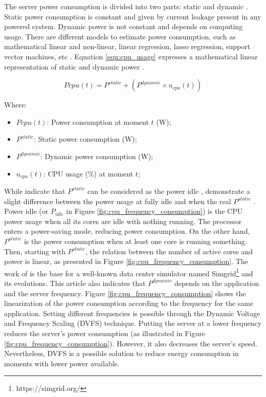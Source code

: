 The server power consumption is divided into two parts: static and dynamic \cite{orgerie2014survey, heinrich2017predicting}. Static power consumption is constant and given by current leakage present in any powered system. Dynamic power is not constant and depends on computing usage. There are different models to estimate power consumption, such as mathematical linear and non-linear, linear regression, lasso regression, support vector machines, etc \cite{ismail2020computing}. Equation \ref{equ:cpu_usage} expresses a mathematical linear representation of static and dynamic power \cite{heinrich2017predicting, ismail2020computing}.

\begin{equation}
    \label{equ:cpu_usage}
    Pcpu(t) = P^{static} + (P^{dynamic} \times u_{cpu}(t))
\end{equation}

Where:
\begin{itemize}
    \item $Pcpu(t)$: Power consumption at moment $t$ (W);
    \item $P^{static}$: Static power consumption (W);
    \item $P^{dynamic}$: Dynamic power consumption (W);
    \item $u_{cpu}(t)$: CPU usage (\%) at moment $t$;
\end{itemize}


While \citeauthor{ismail2020computing} indicate that $P^{static}$ can be considered as the power idle \cite{ismail2020computing}, \citeauthor{heinrich2017predicting} demonstrate a slight difference between the power usage at fully idle and when the real $P^{static}$ \cite{heinrich2017predicting}. Power idle (or $P_{idle}$ in Figure \ref{fig:cpu_frequency_consumption}) is the CPU power usage when all its cores are idle with nothing running. The processor enters a power-saving mode, reducing power consumption. On the other hand, $P^{static}$ is the power consumption when at least one core is running something. Then, starting with $P^{static}$, the relation between the number of active cores and power is linear, as presented in Figure \ref{fig:cpu_frequency_consumption}. The work of \citeauthor{heinrich2017predicting} is the base for a well-known data center simulator named Simgrid\footnote{https://simgrid.org/} and its evolutions. This article also indicates that $P^{dynamic}$ depends on the application and the server frequency. Figure \ref{fig:cpu_frequency_consumption} shows the linearization of the power consumption according to the frequency for the same application. Setting different frequencies is possible through the Dynamic Voltage and Frequency Scaling (DVFS) technique. Putting the server at a lower frequency reduces the server's power consumption (as illustrated in Figure \ref{fig:cpu_frequency_consumption}). However, it also decreases the server's speed. Nevertheless, DVFS is a possible solution to reduce energy consumption in moments with lower power available. 


